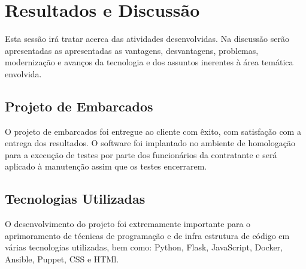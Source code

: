 \chapter[Resultados e Discussão]{Resultados e Discussão}

Esta sessão irá tratar  acerca das atividades desenvolvidas. Na discussão 
serão apresentadas as apresentadas as vantagens, desvantagens, problemas, modernização e avanços da tecnologia
e dos assuntos inerentes à área temática envolvida.

\section{Projeto de Embarcados}
\label{sec:projeto_de_embarcados}
O projeto de embarcados foi entregue ao cliente com êxito, com satisfação com a entrega
dos resultados. O software foi implantado no ambiente de homologação
para a execução de testes por parte dos funcionários da contratante e será aplicado
à manutenção assim que os testes encerrarem.

\section{Tecnologias Utilizadas}
\label{sec:tecnologias_utilizadas}

O desenvolvimento do projeto foi extremamente importante para o aprimoramento de técnicas
de programação e de infra estrutura de código em várias tecnologias utilizadas, bem como:
Python,
Flask, JavaScript, Docker, Ansible, Puppet, CSS e HTMl.



